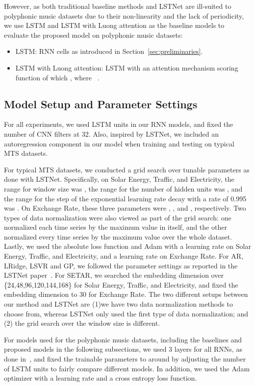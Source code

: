 However, as both traditional baseline methods and LSTNet are ill-suited to polyphonic music datasets due to their non-linearity and the lack of periodicity, we use LSTM and LSTM with Luong attention as the baseline models to evaluate the proposed model on polyphonic music datasets:
\begin{itemize}
    \item LSTM: RNN cells as introduced in Section~\ref{sec:preliminaries}.
    \item LSTM with Luong attention: LSTM with an attention mechanism scoring function of which , where ~\cite{luong}.
\end{itemize}

\subsection{Model Setup and Parameter Settings}
For all experiments, 
we used LSTM units in our RNN models,  and fixed the number of CNN filters at 32. Also, inspired by LSTNet, we included an autoregression component in our model when training and testing on typical MTS datasets.

For typical MTS datasets, we conducted a grid search over tunable parameters as done with LSTNet.
Specifically, on Solar Energy, Traffic, and Electricity, the range for window size  was , the range for the number of hidden units  was , and the range for the step of the exponential learning rate decay with a rate of 0.995 was .
On Exchange Rate, these three parameters were , , and , respectively.
Two types of data normalization were also viewed as part of the grid search: one normalized each time series by the maximum value in itself, and the other normalized every time series by the maximum value over the whole dataset.
Lastly, we used the absolute loss function and Adam with a  learning rate on Solar Energy, Traffic, and Electricity, and a  learning rate on Exchange Rate.
For AR, LRidge, LSVR and GP, we followed the parameter settings as reported in the LSTNet paper~\cite{LSTNet}.
For SETAR, we searched the embedding dimension over \{24,48,96,120,144,168\} for Solar Energy, Traffic, and Electricity, and fixed the embedding dimension to 30 for Exchange Rate.
The two different setups between our method and LSTNet are (1)we have two data normalization methods to choose from, whereas LSTNet only used the first type of data normalization; and (2) the grid search over the window size  is different.

For models used for the polyphonic music datasets, including the baselines and proposed models in the following subsections,
we used 3 layers for all RNNs, as done in~\cite{tonnetz}, and fixed the trainable parameters to around  by adjusting the number of LSTM units to fairly compare different models.
In addition, we used the Adam optimizer with a  learning rate and a cross entropy loss function.


